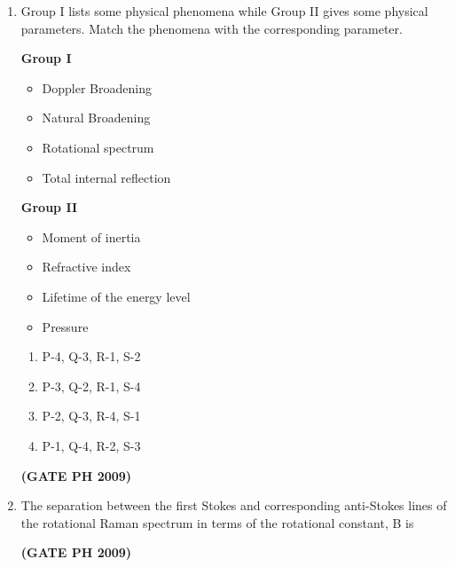 \documentclass[14pt, a4paper]{extarticle}
\begin{document}
\begin{enumerate}[label=\textbf{Q. \arabic*}]
\item Group I lists some physical phenomena while Group II gives some physical parameters. Match the phenomena with the corresponding parameter.
    \begin{center}
    \begin{multicols}{2}
        \textbf{Group I}
        \begin{itemize}
            \item[P.] Doppler Broadening
            \item[Q.] Natural Broadening
            \item[R.] Rotational spectrum
            \item[S.] Total internal reflection
        \end{itemize}
        \textbf{Group II}
        \begin{itemize}
            \item[1.] Moment of inertia
            \item[2.] Refractive index
            \item[3.] Lifetime of the energy level
            \item[4.] Pressure
        \end{itemize}
    \end{multicols}
    \end{center}
    \begin{enumerate}
        \item P-4, Q-3, R-1, S-2
        \item P-3, Q-2, R-1, S-4
        \item P-2, Q-3, R-4, S-1
        \item P-1, Q-4, R-2, S-3
    \end{enumerate}
    \hfill \textbf{(GATE PH 2009)}

\item The separation between the first Stokes and corresponding anti-Stokes lines of the rotational Raman spectrum in terms of the rotational constant, B is
    \begin{enumerate}
    \end{enumerate}
    \hfill \textbf{(GATE PH 2009)}


\end{enumerate}
\end{document}
